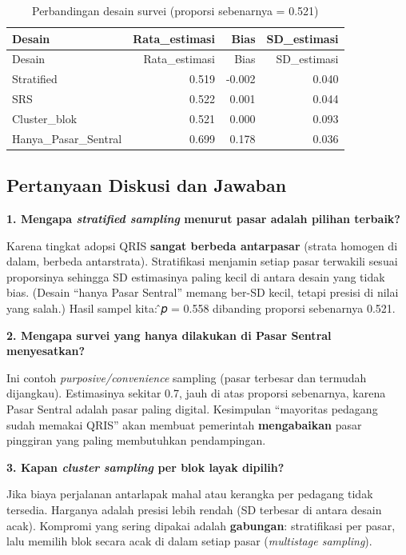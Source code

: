 \documentclass[
  indonesian,
  letterpaper,
]{book}
\begin{document}
\begin{longtable}[]{@{}lrrr@{}}
\caption{Perbandingan desain survei (proporsi sebenarnya =
0.521)}\tabularnewline
\toprule\noalign{}
Desain & Rata\_estimasi & Bias & SD\_estimasi \\
\midrule\noalign{}
\endfirsthead
\toprule\noalign{}
Desain & Rata\_estimasi & Bias & SD\_estimasi \\
\midrule\noalign{}
\endhead
\bottomrule\noalign{}
\endlastfoot
Stratified & 0.519 & -0.002 & 0.040 \\
SRS & 0.522 & 0.001 & 0.044 \\
Cluster\_blok & 0.521 & 0.000 & 0.093 \\
Hanya\_Pasar\_Sentral & 0.699 & 0.178 & 0.036 \\
\end{longtable}

\subsection{Pertanyaan Diskusi dan
Jawaban}\label{pertanyaan-diskusi-dan-jawaban-2}

\textbf{1. Mengapa \emph{stratified sampling} menurut pasar adalah
pilihan terbaik?}

Karena tingkat adopsi QRIS \textbf{sangat berbeda antarpasar} (strata
homogen di dalam, berbeda antarstrata). Stratifikasi menjamin setiap
pasar terwakili sesuai proporsinya sehingga SD estimasinya paling kecil
di antara desain yang tidak bias. (Desain ``hanya Pasar Sentral'' memang
ber-SD kecil, tetapi presisi di nilai yang salah.) Hasil sampel kita: ̂𝑝
= 0.558 dibanding proporsi sebenarnya 0.521.

\textbf{2. Mengapa survei yang hanya dilakukan di Pasar Sentral
menyesatkan?}

Ini contoh \emph{purposive/convenience} sampling (pasar terbesar dan
termudah dijangkau). Estimasinya sekitar 0.7, jauh di atas proporsi
sebenarnya, karena Pasar Sentral adalah pasar paling digital. Kesimpulan
``mayoritas pedagang sudah memakai QRIS'' akan membuat pemerintah
\textbf{mengabaikan} pasar pinggiran yang paling membutuhkan
pendampingan.

\textbf{3. Kapan \emph{cluster} \emph{sampling} per blok layak dipilih?}

Jika biaya perjalanan antarlapak mahal atau kerangka per pedagang tidak
tersedia. Harganya adalah presisi lebih rendah (SD terbesar di antara
desain acak). Kompromi yang sering dipakai adalah \textbf{gabungan}:
stratifikasi per pasar, lalu memilih blok secara acak di dalam setiap
pasar (\emph{multistage sampling}).
\end{document}
